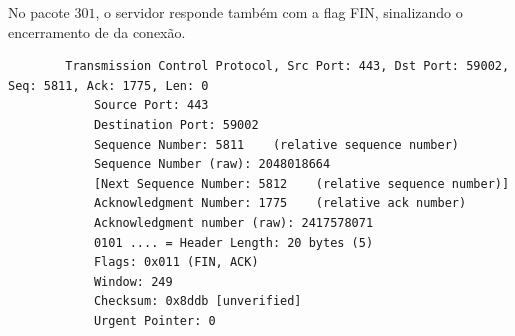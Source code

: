 \begin{parts}
\begin{solution}
        No pacote $301$, o servidor responde também com a flag FIN, sinalizando o encerramento de da conexão.
        \begin{verbatim}
        Transmission Control Protocol, Src Port: 443, Dst Port: 59002, Seq: 5811, Ack: 1775, Len: 0
            Source Port: 443
            Destination Port: 59002
            Sequence Number: 5811    (relative sequence number)
            Sequence Number (raw): 2048018664
            [Next Sequence Number: 5812    (relative sequence number)]
            Acknowledgment Number: 1775    (relative ack number)
            Acknowledgment number (raw): 2417578071
            0101 .... = Header Length: 20 bytes (5)
            Flags: 0x011 (FIN, ACK)
            Window: 249
            Checksum: 0x8ddb [unverified]
            Urgent Pointer: 0
        \end{verbatim}
    \end{solution}
\end{parts}
